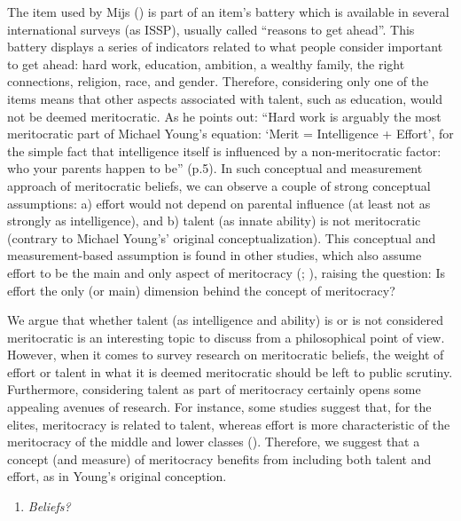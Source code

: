 \documentclass[
  10pt,
  a4paper,
]{article}
\providecommand{\tightlist}{%
  \setlength{\itemsep}{0pt}\setlength{\parskip}{0pt}}
\begin{document}
The item used by Mijs () is part of an item's battery which is available in several international surveys (as ISSP), usually called ``reasons to get ahead''. This battery displays a series of indicators related to what people consider important to get ahead: hard work, education, ambition, a wealthy family, the right connections, religion, race, and gender. Therefore, considering only one of the items means that other aspects associated with talent, such as education, would not be deemed meritocratic. As he points out: ``Hard work is arguably the most meritocratic part of Michael Young's equation: `Merit = Intelligence + Effort', for the simple fact that intelligence itself is influenced by a non-meritocratic factor: who your parents happen to be'' (p.5). In such conceptual and measurement approach of meritocratic beliefs, we can observe a couple of strong conceptual assumptions: a) effort would not depend on parental influence (at least not as strongly as intelligence), and b) talent (as innate ability) is not meritocratic (contrary to Michael Young's' original conceptualization). This conceptual and measurement-based assumption is found in other studies, which also assume effort to be the main and only aspect of meritocracy (; ), raising the question: Is effort the only (or main) dimension behind the concept of meritocracy?

We argue that whether talent (as intelligence and ability) is or is not considered meritocratic is an interesting topic to discuss from a philosophical point of view. However, when it comes to survey research on meritocratic beliefs, the weight of effort or talent in what it is deemed meritocratic should be left to public scrutiny. Furthermore, considering talent as part of meritocracy certainly opens some appealing avenues of research. For instance, some studies suggest that, for the elites, meritocracy is related to talent, whereas effort is more characteristic of the meritocracy of the middle and lower classes (). Therefore, we suggest that a concept (and measure) of meritocracy benefits from including both talent and effort, as in Young's original conception.

\begin{enumerate}
\def\labelenumi{\alph{enumi}.}
\setcounter{enumi}{1}
\tightlist
\item
  \emph{Beliefs?}
\end{enumerate}
\end{document}
